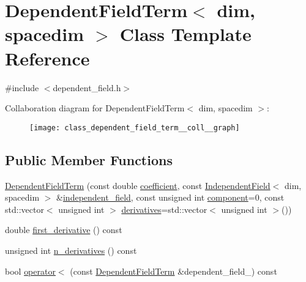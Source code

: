 \hypertarget{class_dependent_field_term}{}\section{Dependent\+Field\+Term$<$ dim, spacedim $>$ Class Template Reference}
\label{class_dependent_field_term}


{\ttfamily \#include $<$dependent\+\_\+field.\+h$>$}



Collaboration diagram for Dependent\+Field\+Term$<$ dim, spacedim $>$\+:\nopagebreak
\begin{figure}[H]
\begin{center}
\leavevmode
\texttt{[image: class\_dependent\_field\_term\_\_coll\_\_graph]}
\end{center}
\end{figure}
\subsection*{Public Member Functions}
\begin{DoxyCompactItemize}
\item 
\hyperlink{class_dependent_field_term_a149a09f602b0baadba9033d6a8da448c}{Dependent\+Field\+Term} (const double \hyperlink{class_dependent_field_term_a59a9183a32ac55fb728f3797b68a9f8f}{coefficient}, const \hyperlink{class_independent_field}{Independent\+Field}$<$ dim, spacedim $>$ \&\hyperlink{class_dependent_field_term_a89d1c3fea36e6fe105232097a321e095}{independent\+\_\+field}, const unsigned int \hyperlink{class_dependent_field_term_ac6f3ac40d4ee2c8b9f9bbdfa34079b74}{component}=0, const std\+::vector$<$ unsigned int $>$ \hyperlink{class_dependent_field_term_af09c5452c3e8e71e9ee99db304b90135}{derivatives}=std\+::vector$<$ unsigned int $>$())
\item 
double \hyperlink{class_dependent_field_term_a9c477ae87acdea43960f399ca2dd10b9}{first\+\_\+derivative} () const 
\item 
unsigned int \hyperlink{class_dependent_field_term_aa1c7aeb391135d4cafa1f208c15517ec}{n\+\_\+derivatives} () const 
\item 
bool \hyperlink{class_dependent_field_term_ab9934d7ad41e3a52073cc11293e7178b}{operator$<$} (const \hyperlink{class_dependent_field_term}{Dependent\+Field\+Term} \&dependent\+\_\+field\+\_) const 
\end{DoxyCompactItemize}
